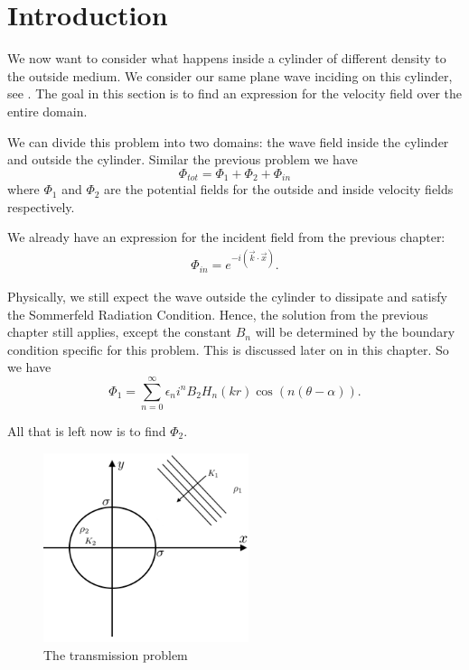 %
\section{Introduction}
We now want to consider what happens inside a cylinder of different density to the outside medium. We consider our same plane wave inciding on this cylinder, see . The goal in this section is to find an expression for the velocity field over the entire domain. \par

We can divide this problem into two domains: the wave field inside the cylinder and outside the cylinder. Similar the previous problem we have
\begin{equation}
  \Phi_{tot} = \Phi_{1} + \Phi_{2} + \Phi_{in}
\end{equation}
where $\Phi_{1}$ and $\Phi_{2}$ are the potential fields for the outside and inside velocity fields respectively.

We already have an expression for the incident field from the previous chapter:
\begin{gather}
  \Phi_{in} = e^{- i(\vec{k} \cdot \vec{x})}.
\end{gather}

Physically, we still expect the wave outside the cylinder to dissipate and satisfy the Sommerfeld Radiation Condition. Hence, the solution from the previous chapter still applies, except the constant $B_n$ will be determined by the boundary condition specific for this problem. This is discussed later on in this chapter. So we have
\begin{equation}
  \Phi_1 = \sum^\infty_{n=0} \epsilon_n i^n B_2 H_n(kr) \cos(n(\theta-\alpha)).
\end{equation}

All that is left now is to find $\Phi_2$.

\begin{figure} \centering
  \includegraphics[width=6cm]{../figures/prob2_sketch.png}
  \caption{The transmission problem}\label{fig:problem_2}
\end{figure}

